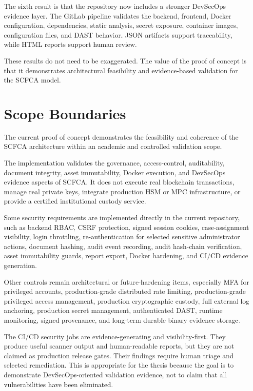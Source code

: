 \documentclass[12pt,a4paper]{report}
\begin{document}
The sixth result is that the repository now includes a stronger DevSecOps evidence layer. The GitLab pipeline validates the backend, frontend, Docker configuration, dependencies, static analysis, secret exposure, container images, configuration files, and DAST behavior. JSON artifacts support traceability, while HTML reports support human review.

These results do not need to be exaggerated. The value of the proof of concept is that it demonstrates architectural feasibility and evidence-based validation for the SCFCA model.

\section{Scope Boundaries}

The current proof of concept demonstrates the feasibility and coherence of the SCFCA architecture within an academic and controlled validation scope.

The implementation validates the governance, access-control, auditability, document integrity, asset immutability, Docker execution, and DevSecOps evidence aspects of SCFCA. It does not execute real blockchain transactions, manage real private keys, integrate production HSM or MPC infrastructure, or provide a certified institutional custody service.

Some security requirements are implemented directly in the current repository, such as backend RBAC, CSRF protection, signed session cookies, case-assignment visibility, login throttling, re-authentication for selected sensitive administrator actions, document hashing, audit event recording, audit hash-chain verification, asset immutability guards, report export, Docker hardening, and CI/CD evidence generation.

Other controls remain architectural or future-hardening items, especially MFA for privileged accounts, production-grade distributed rate limiting, production-grade privileged access management, production cryptographic custody, full external log anchoring, production secret management, authenticated DAST, runtime monitoring, signed provenance, and long-term durable binary evidence storage.

The CI/CD security jobs are evidence-generating and visibility-first. They produce useful scanner output and human-readable reports, but they are not claimed as production release gates. Their findings require human triage and selected remediation. This is appropriate for the thesis because the goal is to demonstrate DevSecOps-oriented validation evidence, not to claim that all vulnerabilities have been eliminated.
\end{document}
